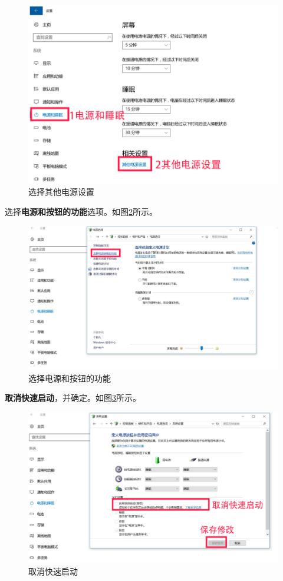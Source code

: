 \documentclass[doctor,openright,twoside]{sjtuthesis}
\theoremstyle{plain}
\theoremstyle{definition}
\theoremstyle{remark}
\theoremstyle{ocrenumbox}
\theoremstyle{plain}
\begin{document}
\begin{figure}
\centering
\includegraphics{images/win10-qidong-03.png}
\caption{选择其他电源设置\label{win10-qidong-03}}
\end{figure}

选择\textbf{电源和按钮的功能}选项。如图\ref{win10-qidong-04}所示。

\begin{figure}
\centering
\includegraphics{images/win10-qidong-04.png}
\caption{选择电源和按钮的功能\label{win10-qidong-04}}
\end{figure}

\textbf{取消快速启动}，并确定。如图\ref{win10-qidong-05}所示。

\begin{figure}
\centering
\includegraphics{images/win10-qidong-05.png}
\caption{取消快速启动\label{win10-qidong-05}}
\end{figure}
\end{document}
